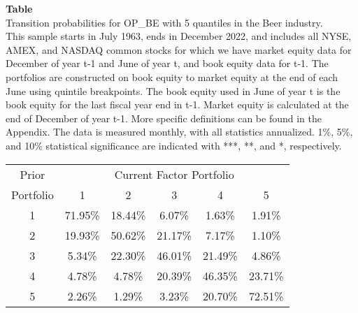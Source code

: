 \begin{table*}[ht!]
\raggedright
{}
\label{tab: transition_probs_OP_BE_Beer_with_5_quantiles}
\textbf{Table \thetable} \\
Transition probabilities for OP_BE with 5 quantiles in the Beer industry. \\
\hspace*{1em}This sample starts in July 1963, ends in December 2022, and includes all NYSE, AMEX, and NASDAQ common stocks for which we have market equity data for December of year t-1 and June of year t, and book equity data for t-1. The portfolios are constructed on book equity to market equity at the end of each June using quintile breakpoints.  The book equity used in June of year t is the book equity for the last fiscal year end in t-1.  Market equity is calculated at the end of December of year t-1.  More specific definitions can be found in the Appendix.  The data is measured monthly, with all statistics annualized.  1\%, 5\%, and 10\% statistical significance are indicated with ***, **, and *, respectively. \\
\vspace{0.5em}
\centering
\begin{adjustbox}{max width=\textwidth}
\begin{tabular}{@{}cccccc@{}}
\toprule
Prior & \multicolumn{5}{c}{Current Factor Portfolio} \\
Portfolio & 1 & 2 & 3 & 4 & 5 \\
\midrule
1 & 71.95\% & 18.44\% & 6.07\% & 1.63\% & 1.91\% \\
2 & 19.93\% & 50.62\% & 21.17\% & 7.17\% & 1.10\% \\
3 & 5.34\% & 22.30\% & 46.01\% & 21.49\% & 4.86\% \\
4 & 4.78\% & 4.78\% & 20.39\% & 46.35\% & 23.71\% \\
5 & 2.26\% & 1.29\% & 3.23\% & 20.70\% & 72.51\% \\
\bottomrule
\end{tabular}
\end{adjustbox}
\end{table*}